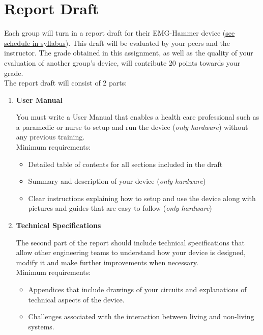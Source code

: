 \documentclass{article}
\begin{document}
\section*{Report Draft}
Each group will turn in a report draft for their EMG-Hammer device (\href{https://github.com/jlongc12/BIOE_385/blob/main/general_course_materials/syllabus.pdf}{see schedule in syllabus}). This draft will be evaluated by your peers and the instructor. The grade obtained in this assignment, as well as the quality of your evaluation of another group’s device, will contribute 20 points towards your grade.\\

The report draft will consist of 2 parts:
\begin{enumerate}
	\item \textbf{User Manual}
	
	You must write a User Manual that enables a health care professional such as a paramedic or nurse to setup and run the device (\textit{only hardware}) without any previous training.\\
	
	Minimum requirements:
	\begin{itemize}
		\item Detailed table of contents for all sections included in the draft
		\item Summary and description of your device (\textit{only hardware})
		\item Clear instructions explaining how to setup and use the device along with pictures and guides that are easy to follow (\textit{only hardware})
	\end{itemize}
	
	\item \textbf{Technical Specifications}
	
	The second part of the report should include technical specifications that allow other engineering teams to understand how your device is designed, modify it and make further improvements when necessary.\\
	
	Minimum requirements:
	\begin{itemize}
		\item Appendices that include drawings of your circuits and explanations of technical aspects of the device.
		\item Challenges associated with the interaction between living and non-living systems.
	\end{itemize}
\end{enumerate}
\end{document}
